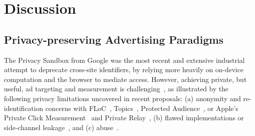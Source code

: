 \section{Discussion}%
\label{sec:future-outlook}

\subsection{Privacy-preserving Advertising Paradigms}
%
The Privacy Sandbox from Google was the most recent and extensive industrial attempt to deprecate cross-site identifiers, by relying more heavily on on-device computation and the browser to mediate access.
%
However, achieving private, but useful, ad targeting and measurement is challenging~\cite{hoganMakingSensePrivate2026}, as illustrated by the following privacy limitations uncovered in recent proposals: (a) anonymity and re-identification concerns
with FLoC~\cite{rescorlaTechnicalCommentsFLoC2021,berkePrivacyLimitationsInterestbased2022}, Topics~\cite{thomsonPrivacyAnalysisGoogles2023,jhaRobustnessTopicsAPI2023,beuginInterestdisclosingMechanismsAdvertising2024,beuginPublicReproducibleAssessment2024}, Protected Audience~\cite{thomsonProtectedAudiencePrivacy2024,longEvaluatingGooglesProtected2024}, or Apple's Private Click Measurement~\cite{thomsonAnalysisApplesPrivate2022} and Private Relay~\cite{zohaibInvestigatingTrafficAnalysis2023},
(b) flawed implementations or side-channel leakage~\cite{turatiLocalitySensitiveHashingDoes2023,aliNavigatingMurkyWaters2023,calderonioFledgingWillContinue2024,nisenoffExploitingSharedStorage2025}, and (c)  abuse~\cite{senolUnveilingImpactUserAgent2023,wieflingPrivacyMeasureTurned2024}.
%
%
%
